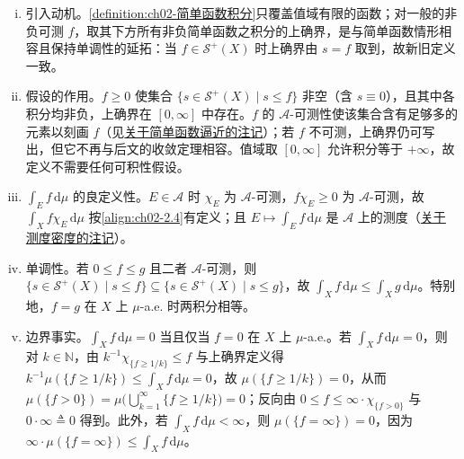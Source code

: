 \documentclass[../../main.tex]{subfiles}%
\begin{document}
\begin{remark}\label{remark:ch02-非负可测积分动机}
\begin{enumerate}[(i)]
\item 引入动机。\cref{definition:ch02-简单函数积分}只覆盖值域有限的函数；对一般的非负可测 $f$，取其下方所有非负简单函数之积分的上确界，是与简单函数情形相容且保持单调性的延拓：当 $f\in\mathscr S^+(X)$ 时上确界由 $s=f$ 取到，故新旧定义一致。
\item 假设的作用。$f\geqslant0$ 使集合 $\{s\in\mathscr S^+(X)\mid s\leqslant f\}$ 非空（含 $s\equiv0$），且其中各积分均非负，上确界在 $[0,\infty]$ 中存在。$f$ 的 $\mathscr A$-可测性使该集合含有足够多的元素以刻画 $f$（见\hyperref[remark:ch02-简单逼近积分]{关于简单函数逼近的注记}）；若 $f$ 不可测，上确界仍可写出，但它不再与后文的收敛定理相容。值域取 $[0,\infty]$ 允许积分等于 $+\infty$，故定义不需要任何可积性假设。
\item $\int_Ef\,\mathrm{d}\mu$ 的良定义性。$E\in\mathscr A$ 时 $\chi_E$ 为 $\mathscr A$-可测，$f\chi_E\geqslant0$ 为 $\mathscr A$-可测，故 $\int_Xf\chi_E\,\mathrm{d}\mu$ 按\eqref{align:ch02-2.4}有定义；且 $E\mapsto\int_Ef\,\mathrm{d}\mu$ 是 $\mathscr A$ 上的测度（\hyperref[remark:ch02-测度密度]{关于测度密度的注记}）。
\item 单调性。若 $0\leqslant f\leqslant g$ 且二者 $\mathscr A$-可测，则 $\{s\in\mathscr S^+(X)\mid s\leqslant f\}\subseteq\{s\in\mathscr S^+(X)\mid s\leqslant g\}$，故 $\int_Xf\,\mathrm{d}\mu\leqslant\int_Xg\,\mathrm{d}\mu$。特别地，$f=g$ 在 $X$ 上 $\mu$-a.e. 时两积分相等。
\item 边界事实。$\int_Xf\,\mathrm{d}\mu=0$ 当且仅当 $f=0$ 在 $X$ 上 $\mu$-a.e.。若 $\int_Xf\,\mathrm{d}\mu=0$，则对 $k\in\mathbb N$，由 $k^{-1}\chi_{\{f\geqslant1/k\}}\leqslant f$ 与上确界定义得 $k^{-1}\mu(\{f\geqslant1/k\})\leqslant\int_Xf\,\mathrm{d}\mu=0$，故 $\mu(\{f\geqslant1/k\})=0$，从而 $\mu(\{f>0\})=\mu\big(\bigcup_{k=1}^\infty\{f\geqslant1/k\}\big)=0$；反向由 $0\leqslant f\leqslant\infty\cdot\chi_{\{f>0\}}$ 与 $0\cdot\infty\triangleq0$ 得到。此外，若 $\int_Xf\,\mathrm{d}\mu<\infty$，则 $\mu(\{f=\infty\})=0$，因为 $\infty\cdot\mu(\{f=\infty\})\leqslant\int_Xf\,\mathrm{d}\mu$。
\end{enumerate}
\end{remark}
\end{document}
